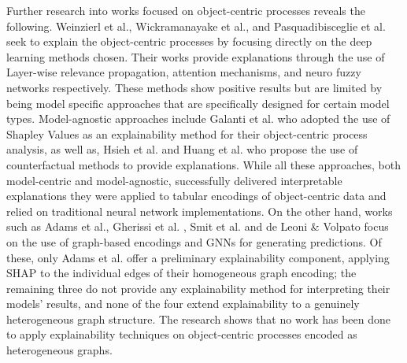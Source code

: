         Further research into works focused on object-centric processes reveals the following. Weinzierl et al.\cite{weinzierl2020}, Wickramanayake et al.\cite{wickramanayake2022}, and Pasquadibisceglie et al. \cite{pasquadibisceglie2021} seek to explain the object-centric processes by focusing directly on the deep learning methods chosen. Their works provide explanations through the use of Layer-wise relevance propagation, attention mechanisms, and neuro fuzzy networks respectively. These methods show positive results but are limited by being model specific approaches that are specifically designed for certain model types. Model-agnostic approaches include Galanti et al. \cite{galanti2023b} \cite{galanti2023a} who adopted the use of Shapley Values as an explainability method for their object-centric process analysis, as well as, Hsieh et al.\cite{hsieh2021} and Huang et al.\cite{huang2022} who propose the use of counterfactual methods to provide explanations. While all these approaches, both model-centric and model-agnostic, successfully delivered interpretable explanations they were applied to tabular encodings of object-centric data and relied on traditional neural network implementations. On the other hand, works such as Adams et al.\cite{adams2022}, Gherissi et al. \cite{gherissi2025}, Smit et al.\cite{smit2024} and de Leoni \& Volpato \cite{deleonieVolpato} focus on the use of graph-based encodings and GNNs for generating predictions. Of these, only Adams et al. offer a preliminary explainability component, applying SHAP to the individual edges of their homogeneous graph encoding; the remaining three do not provide any explainability method for interpreting their models' results, and none of the four extend explainability to a genuinely heterogeneous graph structure. The research shows that no work has been done to apply explainability techniques on object-centric processes encoded as heterogeneous graphs.
    
